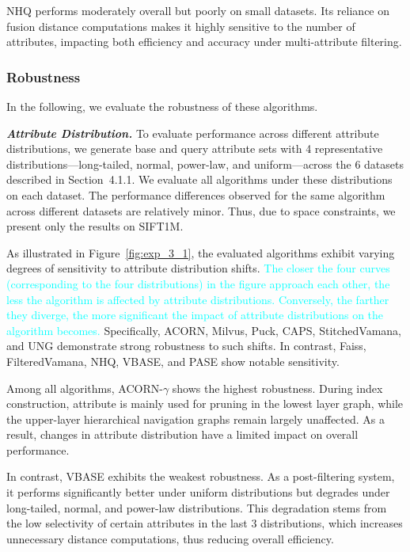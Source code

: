 \documentclass[sigconf, nonacm]{acmart}
\begin{document}
	NHQ performs moderately overall but poorly on small datasets. Its reliance on fusion distance computations makes it highly sensitive to the number of attributes, impacting both efficiency and accuracy under multi-attribute filtering.
	
	
	
	
	\subsubsection{Robustness}In the following, we evaluate the robustness of these algorithms.
	
	\textit{\textbf{Attribute Distribution.}} To evaluate performance across different attribute distributions, we generate base and query attribute sets with 4 representative distributions—long-tailed, normal, power-law, and uniform—across the 6 datasets described in Section~4.1.1. We evaluate all algorithms under these distributions on each dataset. The performance differences observed for the same algorithm across different datasets are relatively minor. Thus, due to space constraints, we present only the results on SIFT1M.
	
	As illustrated in Figure~\ref{fig:exp_3_1}, the evaluated algorithms exhibit varying degrees of sensitivity to attribute distribution shifts. \textcolor{cyan}{The closer the four curves (corresponding to the four distributions) in the figure approach each other, the less the algorithm is affected by attribute distributions. Conversely, the farther they diverge, the more significant the impact of attribute distributions on the algorithm becomes.} Specifically, ACORN, Milvus, Puck, CAPS, StitchedVamana, and UNG demonstrate strong robustness to such shifts. In contrast, Faiss, FilteredVamana, NHQ, VBASE, and PASE show notable sensitivity.
	
	Among all algorithms, ACORN-\(\gamma\) shows the highest robustness. During index construction, attribute is mainly used for pruning in the lowest layer graph, while the upper-layer hierarchical navigation graphs remain largely unaffected. As a result, changes in attribute distribution have a limited impact on overall performance.
	
	In contrast, VBASE exhibits the weakest robustness. As a post-filtering system, it performs significantly better under uniform distributions but degrades under long-tailed, normal, and power-law distributions. This degradation stems from the low selectivity of certain attributes in the last 3 distributions, which increases unnecessary distance computations, thus reducing overall efficiency.
	
\end{document}
